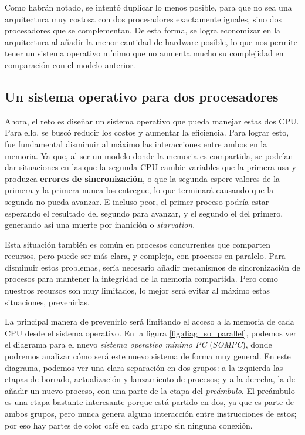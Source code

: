 \documentclass[letterpaper,12pt,oneside]{book}
\begin{document}
		
		
		Como habrán notado, se intentó duplicar lo menos posible, para que no sea una arquitectura muy costosa con dos procesadores 
		exactamente iguales,
		sino dos procesadores que se complementan.  De esta forma, se logra economizar en la arquitectura al añadir la menor cantidad de hardware posible, 
		lo  que nos permite tener un sistema operativo mínimo que no aumenta mucho su complejidad en comparación con el modelo anterior.
	 	
	 	\subsection{Un sistema operativo para dos procesadores}
	 		
	 		Ahora, el reto es diseñar un sistema operativo que pueda manejar estas dos CPU. Para ello, se buscó reducir los costos
	 		y aumentar la eficiencia. Para lograr esto, fue fundamental disminuir al máximo las interacciones entre ambos en la memoria. Ya que, al
	 		ser un modelo donde la memoria es compartida,
	 		se podrían dar situaciones en las que la segunda CPU cambie variables que la primera usa y produzca 
	 		\textbf{errores de sincronización},
	 		o que la segunda espere valores de la primera y la primera nunca los entregue, lo que terminará causando que la segunda no pueda avanzar. E 
	 		incluso
	 		peor, el primer proceso podría estar esperando el resultado del segundo para avanzar, y el segundo el del primero, generando así
	 		una muerte por inanición o \textit{starvation}. 
    
            Esta situación también es común en procesos concurrentes que comparten recursos, pero
	 		puede ser más clara, y compleja, con procesos en paralelo. Para disminuir estos problemas, sería necesario añadir mecanismos de 
	 		sincronización de procesos para
	 		mantener la integridad de la memoria compartida. Pero como nuestros recursos son muy limitados, lo mejor será evitar al máximo estas 
	 		situaciones, prevenirlas.
	 		
	 		La principal manera de prevenirlo será limitando el acceso a la memoria de cada CPU desde el sistema operativo. En la figura 
	 		\ref{fig:diag_so_parallel},
	 		podemos ver el diagrama para el nuevo 
	 		\textit{sistema operativo mínimo PC} (\textit{SOMPC}), donde podremos analizar cómo será este nuevo sistema de forma muy 
	 		general. En este diagrama, podemos ver una clara separación en dos grupos: a la izquierda
	 		las etapas de borrado, actualización y lanzamiento de procesos; y a la derecha, la de añadir un nuevo proceso, con una parte de la 
	 		etapa
	 		del \textit{preámbulo}. El preámbulo es una etapa bastante interesante porque está partido en dos, ya que es parte de ambos grupos, pero 
	 		nunca genera alguna interacción entre instrucciones de estos; por eso hay partes de color café en cada grupo sin ninguna conexión.
\end{document}
